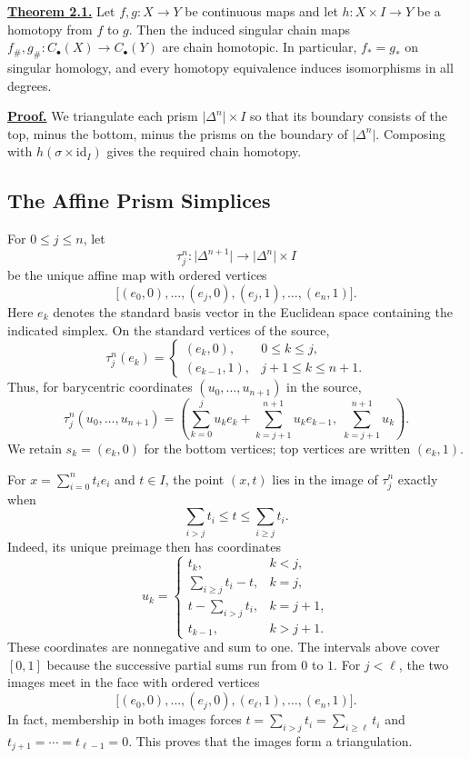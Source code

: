 \documentclass[11pt]{article}
\newcommand{\facehead}[1]{\par\Needspace{4\baselineskip}\subsection{#1}}
\begin{document}
\label{sec:result}\hypertarget{thm12}{}\textbf{\hyperlink{proof12}{Theorem 2.1.}} Let $f,g:X\to Y$ be continuous maps and let $h:X\times I\to Y$ be a homotopy from $f$ to $g$. Then the induced singular chain maps $f_\#,g_\#:C_\bullet(X)\to C_\bullet(Y)$ are chain homotopic. In particular, $f_*=g_*$ on singular homology, and every homotopy equivalence induces isomorphisms in all degrees.

\label{sec:details}\hypertarget{proof12}{}\textbf{\hyperlink{thm12}{Proof.}} We triangulate each prism $\lvert\Delta^n\rvert\times I$ so that its boundary consists of the top, minus the bottom, minus the prisms on the boundary of $\lvert\Delta^n\rvert$. Composing with $h(\sigma\times\mathrm{id}_I)$ gives the required chain homotopy.

\facehead{The Affine Prism Simplices}
For $0\le j\le n$, let
\[
\tau_j^n:\lvert\Delta^{n+1}\rvert\longrightarrow\lvert\Delta^n\rvert\times I
\]
be the unique affine map with ordered vertices
\[
\bigl[(e_0,0),\ldots,(e_j,0),(e_j,1),\ldots,(e_n,1)\bigr].
\]
Here $e_k$ denotes the standard basis vector in the Euclidean space containing the indicated simplex. On the standard vertices of the source,
\[
\tau_j^n(e_k)=
\begin{cases}
(e_k,0),&0\le k\le j,\\
(e_{k-1},1),&j+1\le k\le n+1.
\end{cases}
\]
Thus, for barycentric coordinates $(u_0,\ldots,u_{n+1})$ in the source,
\[
\tau_j^n(u_0,\ldots,u_{n+1})=
\left(\sum_{k=0}^{j}u_ke_k+\sum_{k=j+1}^{n+1}u_ke_{k-1},\;
\sum_{k=j+1}^{n+1}u_k\right).
\]
We retain $s_k=(e_k,0)$ for the bottom vertices; top vertices are written $(e_k,1)$.

For $x=\sum_{i=0}^nt_ie_i$ and $t\in I$, the point $(x,t)$ lies in the image of $\tau_j^n$ exactly when
\[
\sum_{i>j}t_i\le t\le\sum_{i\ge j}t_i.
\]
Indeed, its unique preimage then has coordinates
\[
u_k=
\begin{cases}
t_k,&k<j,\\
\displaystyle\sum_{i\ge j}t_i-t,&k=j,\\
\displaystyle t-\sum_{i>j}t_i,&k=j+1,\\
t_{k-1},&k>j+1.
\end{cases}
\]
These coordinates are nonnegative and sum to one. The intervals above cover $[0,1]$ because the successive partial sums run from $0$ to $1$. For $j<\ell$, the two images meet in the face with ordered vertices
\[
\bigl[(e_0,0),\ldots,(e_j,0),(e_\ell,1),\ldots,(e_n,1)\bigr].
\]
In fact, membership in both images forces $t=\sum_{i>j}t_i=\sum_{i\ge\ell}t_i$ and $t_{j+1}=\cdots=t_{\ell-1}=0$. This proves that the images form a triangulation.
\end{document}
